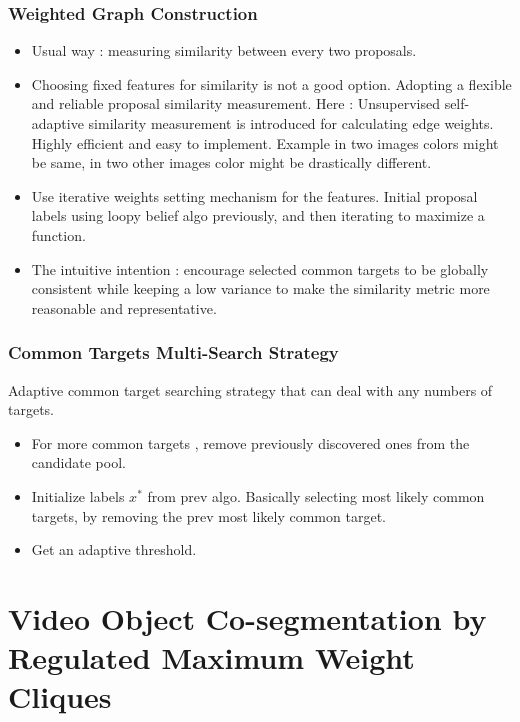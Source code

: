 \documentclass{article}
\begin{document}
\subsubsection{Weighted Graph Construction}
\begin{itemize}
\item Usual way : measuring similarity between every two proposals.
\item Choosing fixed features for similarity is not a good option. Adopting a flexible and reliable proposal similarity measurement. Here : Unsupervised self-adaptive similarity measurement is introduced for calculating edge weights. Highly efficient and easy to implement. Example in two images colors might be same, in two other images color might be drastically different.
\item Use iterative weights setting mechanism for the features. Initial proposal labels using loopy belief algo previously, and then iterating to maximize a function.
\item The intuitive intention : encourage selected common targets to be globally consistent while keeping a low variance to make the similarity metric more reasonable and representative.
\end{itemize}

\subsubsection{Common Targets Multi-Search Strategy}
Adaptive common target searching strategy that can deal with any numbers of targets.

\begin{itemize}
\item For more common targets , remove previously discovered ones from the candidate pool.
\item Initialize labels $x^{*}$ from prev algo. Basically selecting most likely common targets, by removing the prev most likely common target.
\item Get an adaptive threshold.
\end{itemize}

\section{Video Object Co-segmentation by Regulated Maximum Weight Cliques}
\cite{Zhang2014}
\end{document}
